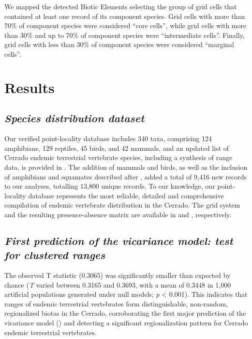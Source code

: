 \documentclass[12pt,openright,oneside,a4paper,english]{abntex2}
\begin{document}
We mapped the detected Biotic Elements selecting the group of grid cells that contained at least one record of its component species. Grid cells with more than 70\% of component species were considered “core cells”, while grid cells with more than 30\% and up to 70\% of component species were “intermediate cells”. Finally, grid cells with less than 30\% of component species were considered “marginal cells”.

\section{Results}
\subsection{\textit{Species distribution dataset}}

Our verified point-locality database includes 340 taxa, comprising 124 amphibians, 129 reptiles, 45 birds, and 42 mammals, and an updated list of Cerrado endemic terrestrial vertebrate species, including a synthesis of range data, is provided in . The addition of mammals and birds, as well as the inclusion of amphibians and squamates described after \citet{Azevedo2016}, added a total of 9,416 new records to our analyses, totalling 13,800 unique records. To our knowledge, our point-locality database represents the most reliable, detailed and comprehensive compilation of endemic vertebrate distribution in the Cerrado. The grid system and the resulting presence-absence matrix are available in  and , respectively.

\subsection{\textit{First prediction of the vicariance model: test for clustered ranges}}

The observed T statistic (0.3065) was significantly smaller than expected by chance (\textit{T} varied between 0.3165 and 0.3693, with a mean of 0.3448 in 1,000 artificial populations generated under null models; \textit{p} < 0.001). This indicates that ranges of endemic terrestrial vertebrates form distinguishable, non-random, regionalized biotas in the Cerrado, corroborating the first major prediction of the vicariance model (\citealp[see][]{Hausdorf2003, Hennig2004, Hausdorf2006}) and detecting a significant regionalization pattern for Cerrado endemic terrestrial vertebrates.
\end{document}
